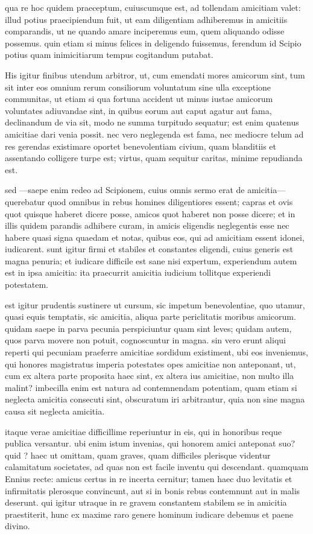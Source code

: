  qua re hoc quidem praeceptum, cuiuscumque est, ad tollendam amicitiam valet: illud potius praecipiendum fuit, ut eam diligentiam adhiberemus in amicitiis comparandis, ut ne quando amare inciperemus eum, quem aliquando odisse possemus. quin etiam si minus felices in deligendo fuissemus, ferendum id Scipio potius quam inimicitiarum tempus cogitandum putabat.

 His igitur finibus utendum arbitror, ut, cum emendati mores amicorum sint, tum sit inter eos omnium rerum consiliorum voluntatum sine ulla exceptione communitas, ut etiam si qua fortuna accident ut minus iustae amicorum voluntates adiuvandae sint, in quibus eorum aut caput agatur aut fama, declinandum de via sit, modo ne summa turpitudo sequatur; est enim quatenus amicitiae dari venia possit. nec vero neglegenda est fama, nec mediocre telum ad res gerendas existimare oportet benevolentiam civium, quam blanditiis et assentando colligere turpe est; virtus, quam sequitur caritas, minime repudianda est.

 sed —saepe enim redeo ad Scipionem, cuius omnis sermo erat de amicitia—querebatur quod omnibus in rebus homines diligentiores essent; capras et ovis quot quisque haberet dicere posse, amicos quot haberet non posse dicere; et in illis quidem parandis adhibere curam, in amicis eligendis neglegentis esse nec habere quasi signa quaedam et notas, quibus eos, qui ad amicitiam essent idonei, iudicarent. sunt igitur firmi et stabiles et constantes eligendi, cuius generis est magna penuria; et iudicare difficile est sane nisi expertum, experiendum autem est in ipsa amicitia: ita praecurrit amicitia iudicium tollitque experiendi potestatem.

 est igitur prudentis sustinere ut cursum, sic impetum benevolentiae, quo utamur, quasi equis temptatis, sic amicitia, aliqua parte periclitatis moribus amicorum. quidam saepe in parva pecunia perspiciuntur quam sint leves; quidam autem, quos parva movere non potuit, cognoscuntur in magna. sin vero erunt aliqui reperti qui pecuniam praeferre amicitiae sordidum existiment, ubi eos inveniemus, qui honores magistratus imperia potestates opes amicitiae non anteponant, ut, cum ex altera parte proposita haec sint, ex altera ius amicitiae, non multo illa malint? imbecilla enim est natura ad contemnendam potentiam, quam etiam si neglecta amicitia consecuti sint, obscuratum iri arbitrantur, quia non sine magna causa sit neglecta amicitia.

 itaque verae amicitiae difficillime reperiuntur in eis, qui in honoribus reque publica versantur. ubi enim istum invenias, qui honorem amici anteponat suo? quid ? haec ut omittam, quam graves, quam difficiles plerisque videntur calamitatum societates, ad quas non est facile inventu qui descendant. quamquam Ennius recte: amicus certus in re incerta cernitur; tamen haec duo levitatis et infirmitatis plerosque convincunt, aut si in bonis rebus contemnunt aut in malis deserunt. qui igitur utraque in re gravem constantem stabilem se in amicitia praestiterit, hunc ex maxime raro genere hominum iudicare debemus et paene divino.

